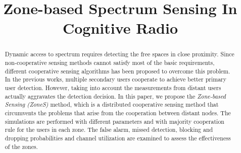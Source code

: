 \documentclass[conference,compsoc]{IEEEtran}
\begin{document}
\title{Zone-based Spectrum Sensing In Cognitive Radio}


\IEEEoverridecommandlockouts
\author{
  }








\maketitle

\begin{abstract}
Dynamic access to spectrum requires detecting the free spaces in close proximity. Since non-cooperative sensing methods cannot satisfy most of the basic requirements, different cooperative sensing algorithms has been proposed to overcome this problem. In the previous works, multiple secondary users cooperate to achieve better primary user detection. However, taking into account the measurements from distant users actually aggravates the detection decision. In this paper, we propose the \textit{Zone-based Sensing (ZoneS)} method, which is a distributed cooperative sensing method that circumvents the problems that arise from the cooperation between distant nodes. The simulations are performed with different parameters and with majority cooperation rule for the users in each zone. The false alarm, missed detection, blocking and dropping probabilities and channel utilization are examined to assess the effectiveness of the zones.
\end{abstract}
\end{document}
